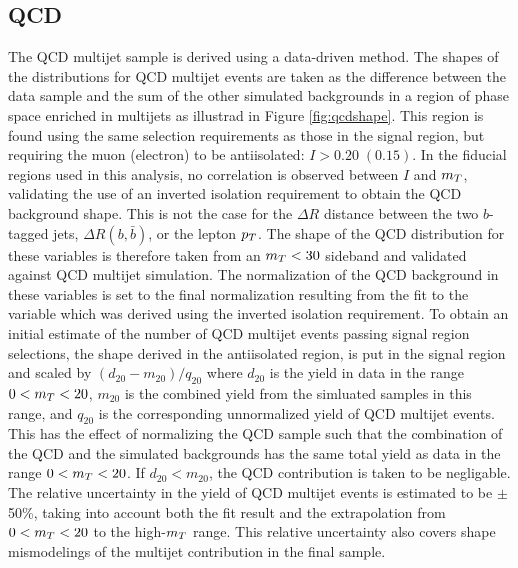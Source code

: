 \subsection{QCD}
\label{sec:qcd}
The QCD multijet sample is derived using a data-driven method. 
The shapes of the distributions for QCD multijet events are taken as the difference between
 the data sample and the sum of the other simulated backgrounds in a region of phase
 space enriched in multijets as illustrad in Figure \ref{fig:qcdshape}.
This region is found using the same selection requirements as those in the signal region,
 but requiring the muon (electron) to be antiisolated: $I > 0.20 \; (0.15)$.
In the fiducial regions used in this analysis,
 no correlation is observed between $I$ and $m_T$, validating
 the use of an inverted isolation requirement to obtain
 the QCD background shape.
This is not the case for the $\Delta R$ distance between the
 two $b$-tagged jets, $\Delta R(b,\bar{b})$, or the lepton $p_T$.
The shape of the QCD distribution for these variables is therefore
 taken from an $m_T<30$ \GeV sideband and validated against
 QCD multijet simulation.
The normalization of the QCD background
 in these variables is set to the final
 normalization resulting from the fit to the \mt variable
 which was derived using the inverted isolation requirement.
To obtain an initial estimate of the number of QCD multijet
 events passing signal region selections, the
 shape derived in the antiisolated region, is
 put in the signal region and scaled by $ (d_{20}-m_{20})/q_{20} $ where
 $d_{20}$ is the yield in data in the range $0<m_T<20$, $m_{20}$ is the combined
 yield from the simluated samples in this range, and $q_{20}$ is the corresponding
 unnormalized yield of QCD multijet events.
This has the effect of normalizing the QCD sample such that the combination of the QCD 
 and the simulated backgrounds has the same total yield as data in the range $0<m_T<20$.
If $d_{20}<m_{20}$, the QCD contribution is taken to be negligable. %
The relative uncertainty in the yield of QCD multijet events is
 estimated to be $\pm$50\%, taking into account both the fit result
 and the extrapolation from $0<m_T<20$ to the high-$m_T$ range.
This relative uncertainty also covers shape mismodelings
 of the multijet contribution in the final sample.


